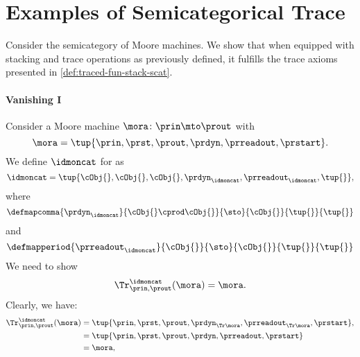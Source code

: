 \section{Examples of Semicategorical Trace}
\begin{example}
    Consider the semicategory \Moore of Moore machines.
    We show that when equipped with stacking and trace operations as previously defined, it fulfills the trace axioms presented in \cref{def:traced-fun-stack-scat}.

    \paragraph*{Vanishing I}
    Consider a Moore machine $\mora\colon \prin \mto \prout$ with
    \begin{equation*}
        \mora=\tup{\prin,\prst, \prout, \prdyn,\prreadout,\prstart}.
    \end{equation*}
    We define $\idmoncat$ for \Moore as
    \begin{equation*}
        \idmoncat=\tup{\cObj{},\cObj{},\cObj{},\prdyn_\idmoncat, \prreadout_\idmoncat, \tup{}},
    \end{equation*}
    where
    \begin{equation*}
        \defmapcomma{\prdyn_{\idmoncat}}
        {\cObj{} \cprod \cObj{}}
        {\sto}
        {\cObj{}}
        {\tup{}}
        {\tup{}}
    \end{equation*}
    and
    \begin{equation*}
        \defmapperiod{\prreadout_{\idmoncat}}
        {\cObj{}}
        {\sto}
        {\cObj{}}
        {\tup{}}
        {\tup{}}
    \end{equation*}
    We need to show
    \begin{equation*}
        \Tr_{\prin,\prout}^{\idmoncat}(\mora)=\mora.
    \end{equation*}
    Clearly, we have:
    \begin{equation*}
        \begin{aligned}
            \Tr_{\prin,\prout}^{\idmoncat}(\mora) & =\tup{\prin, \prst, \prout, \prdyn_{\Tr \mora}, \prreadout_{\Tr \mora},\prstart}, \\
                                                  & =\tup{\prin, \prst, \prout, \prdyn, \prreadout,\prstart} \\
                                                  & =\mora,

\end{aligned}
\end{equation*}
\end{example}
